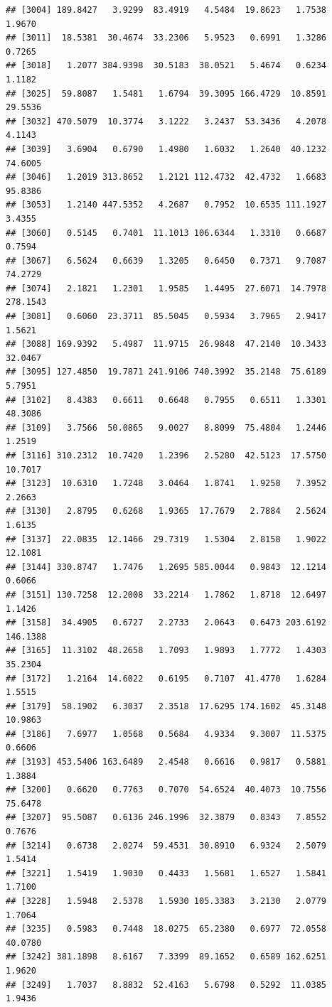 \documentclass{article}\usepackage[]{graphicx}\usepackage[]{color}
\makeatletter
\newenvironment{kframe}{%
 \def\at@end@of@kframe{}%
 \ifinner\ifhmode%
  \def\at@end@of@kframe{\end{minipage}}%
  \begin{minipage}{\columnwidth}%
 \fi\fi%
 \def\FrameCommand##1{\hskip\@totalleftmargin \hskip-\fboxsep
 \colorbox{shadecolor}{##1}\hskip-\fboxsep
     \hskip-\linewidth \hskip-\@totalleftmargin \hskip\columnwidth}%
 \MakeFramed {\advance\hsize-\width
   \@totalleftmargin\z@ \linewidth\hsize
   \@setminipage}}%
 {\par\unskip\endMakeFramed%
 \at@end@of@kframe}
\newenvironment{knitrout}{}{} %
\makeatother
\begin{document}
\begin{knitrout}
\begin{kframe}
\begin{verbatim}
## [3004] 189.8427   3.9299  83.4919   4.5484  19.8623   1.7538   1.9670
## [3011]  18.5381  30.4674  33.2306   5.9523   0.6991   1.3286   0.7265
## [3018]   1.2077 384.9398  30.5183  38.0521   5.4674   0.6234   1.1182
## [3025]  59.8087   1.5481   1.6794  39.3095 166.4729  10.8591  29.5536
## [3032] 470.5079  10.3774   3.1222   3.2437  53.3436   4.2078   4.1143
## [3039]   3.6904   0.6790   1.4980   1.6032   1.2640  40.1232  74.6005
## [3046]   1.2019 313.8652   1.2121 112.4732  42.4732   1.6683  95.8386
## [3053]   1.2140 447.5352   4.2687   0.7952  10.6535 111.1927   3.4355
## [3060]   0.5145   0.7401  11.1013 106.6344   1.3310   0.6687   0.7594
## [3067]   6.5624   0.6639   1.3205   0.6450   0.7371   9.7087  74.2729
## [3074]   2.1821   1.2301   1.9585   1.4495  27.6071  14.7978 278.1543
## [3081]   0.6060  23.3711  85.5045   0.5934   3.7965   2.9417   1.5621
## [3088] 169.9392   5.4987  11.9715  26.9848  47.2140  10.3433  32.0467
## [3095] 127.4850  19.7871 241.9106 740.3992  35.2148  75.6189   5.7951
## [3102]   8.4383   0.6611   0.6648   0.7955   0.6511   1.3301  48.3086
## [3109]   3.7566  50.0865   9.0027   8.8099  75.4804   1.2446   1.2519
## [3116] 310.2312  10.7420   1.2396   2.5280  42.5123  17.5750  10.7017
## [3123]  10.6310   1.7248   3.0464   1.8741   1.9258   7.3952   2.2663
## [3130]   2.8795   0.6268   1.9365  17.7679   2.7884   2.5624   1.6135
## [3137]  22.0835  12.1466  29.7319   1.5304   2.8158   1.9022  12.1081
## [3144] 330.8747   1.7476   1.2695 585.0044   0.9843  12.1214   0.6066
## [3151] 130.7258  12.2008  33.2214   1.7862   1.8718  12.6497   1.1426
## [3158]  34.4905   0.6727   2.2733   2.0643   0.6473 203.6192 146.1388
## [3165]  11.3102  48.2658   1.7093   1.9893   1.7772   1.4303  35.2304
## [3172]   1.2164  14.6022   0.6195   0.7107  41.4770   1.6284   1.5515
## [3179]  58.1902   6.3037   2.3518  17.6295 174.1602  45.3148  10.9863
## [3186]   7.6977   1.0568   0.5684   4.9334   9.3007  11.5375   0.6606
## [3193] 453.5406 163.6489   2.4548   0.6616   0.9817   0.5881   1.3884
## [3200]   0.6620   0.7763   0.7070  54.6524  40.4073  10.7556  75.6478
## [3207]  95.5087   0.6136 246.1996  32.3879   0.8343   7.8552   0.7676
## [3214]   0.6738   2.0274  59.4531  30.8910   6.9324   2.5079   1.5414
## [3221]   1.5419   1.9030   0.4433   1.5681   1.6527   1.5841   1.7100
## [3228]   1.5948   2.5378   1.5930 105.3383   3.2130   2.0779   1.7064
## [3235]   0.5983   0.7448  18.0275  65.2380   0.6977  72.0558  40.0780
## [3242] 381.1898   8.6167   7.3399  89.1652   0.6589 162.6251   1.9620
## [3249]   1.7037   8.8832  52.4163   5.6798   0.5292  11.0385   1.9436

\end{verbatim}
\end{kframe}
\end{knitrout}
\end{document}
